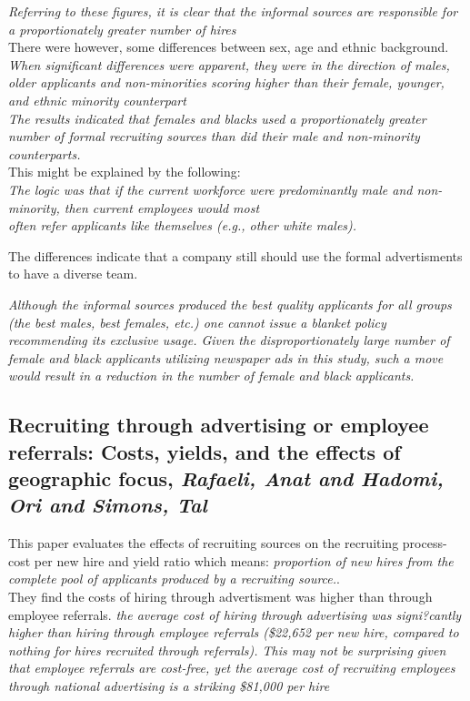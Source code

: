 \documentclass[a4paper, 11pt]{article} %
\begin{document}
\emph{Referring to these figures, it is clear that the informal sources are
responsible for a proportionately greater number of hires }\\

There were however, some differences between sex, age and ethnic background. \\

\emph{When significant differences were apparent, they were in
the direction of males, older applicants and non-minorities scoring higher
than their female, younger, and ethnic minority counterpart}\\

\emph{The results indicated that females and blacks
used a proportionately greater number of formal recruiting sources than did
their male and non-minority counterparts.}\\

This might be explained by the following:\\
\emph{The logic was that if the current workforce were
predominantly male and non-minority, then current employees would most\\
often refer applicants like themselves (e.g., other white males).}

The differences indicate that a company still should use the formal advertisments to have a diverse team. 

\emph{Although
the informal sources produced the best quality applicants for all groups (the
best males, best females, etc.) one cannot issue a blanket policy recommending its exclusive usage. Given the disproportionately large number
of female and black applicants utilizing newspaper ads in this study, such
a move would result in a reduction in the number of female and black
applicants.}\\


\subsection*{Recruiting through advertising or employee referrals: Costs, yields, and the effects of geographic focus, \emph{Rafaeli, Anat and Hadomi, Ori and Simons, Tal} \cite{eleventh}}
This paper evaluates the effects of recruiting sources on the recruiting process-cost per new hire and yield ratio which means: \emph{proportion of new hires from the complete pool of applicants produced by a
recruiting source.}.\\

They find the costs of hiring through advertisment was higher than through employee referrals.
\emph{the average cost of hiring through advertising was
signi?cantly higher than hiring through employee referrals (\$22,652 per new
hire, compared to nothing for hires recruited through referrals). This may
not be surprising given that employee referrals are cost-free, yet the average
cost of recruiting employees through national advertising is a striking
\$81,000 per hire}\\
\end{document}
